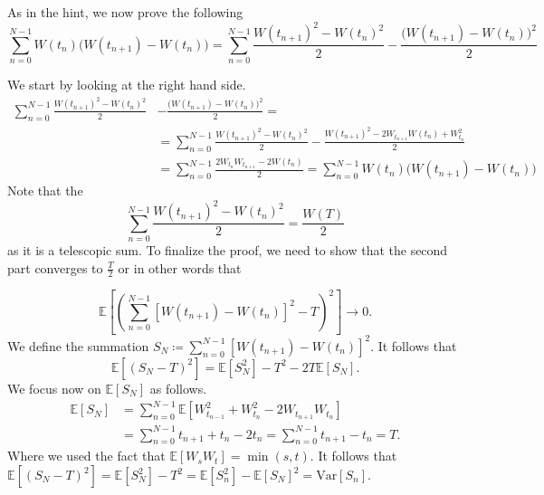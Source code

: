 \documentclass[a4paper,12pt]{article} %
\newcommand{\Var}{\mathrm{Var}}
\begin{document}
\subsection{}
As in the hint, we now prove the following
\begin{equation}
    \sum_{n=0}^{N-1} W(t_n) \big( W(t_{n+1}) - W(t_n) \big) = \sum_{n=0}^{N-1} \frac{W(t_{n+1})^2 - W(t_n)^2}{2} - \frac{\big( W(t_{n+1}) - W(t_n) \big)^2}{2}
\end{equation}

We start by looking at the right hand side.
\begin{align*}
    \sum_{n=0}^{N-1} \frac{W(t_{n+1})^2 - W(t_n)^2}{2}
     & - \frac{\big( W(t_{n+1}) - W(t_n) \big)^2}{2}  =                                                                         \\
     & =  \sum_{n=0}^{N-1} \frac{W(t_{n+1})^2 - W(t_n)^2}{2} - \frac{W(t_{n+1})^{2}  - 2W_{t_{n+1}} W(t_n)  + W_{t_n}^{2} }{2}  \\
     & = \sum_{n=0}^{N-1} \frac{2W_{t_n}W_{t_{n+1} } - 2 W(t_n)}{2}  =  \sum_{n=0}^{N-1} W(t_n) \big( W(t_{n+1}) - W(t_n) \big)
\end{align*}
Note that the
\begin{equation}
    \sum_{n=0}^{N-1} \frac{W(t_{n+1})^2 - W(t_n)^2}{2}  = \frac{W(T)}{2}
\end{equation}
as it is a telescopic sum. To finalize the proof, we need to show that the second part converges to \(\frac{T}{2}\) or in other words that

\begin{equation}
    \mathbb{E} \left[ \left( \sum_{n=0}^{N-1} \left[ W(t_{n+1}) - W(t_n) \right]^2 - T \right)^{2}   \right] \to 0.
\end{equation}
We define the summation \(S_N\coloneqq  \sum_{n=0}^{N-1} \left[ W(t_{n+1}) - W(t_n) \right]^2 \).
It follows that
\begin{equation}
    \mathbb{E} \left[ (S_N - T)^2 \right]  = \mathbb{E} \left[ S_N ^2 \right] - T^2 -2 T\mathbb{E} \left[ S_N  \right].
\end{equation}
We focus now on \(\mathbb{E} \left[ S_N \right]\) as follows.
\begin{align*}
    \mathbb{E} \left[ S_N \right] &
    = \sum_{n=0}^{N-1} \mathbb{E} \left[ W_{t_{n-1} }^{2}+W_{t_n}^2 - 2 W_{t_{n+1} }W_{t_n} \right]              \\
                                  & =\sum_{n=0} ^{N-1}  t_{n+1} +t_n -2t_n = \sum_{n=0} ^{N-1} t_{n+1} -t_n = T.
\end{align*}
Where we used the fact that \(\mathbb{E} \left[ W_s W_t \right] = \min(s,t)\).
It follows that \(\mathbb{E} \left[ (S_N-T)^2 \right]= \mathbb{E} \left[ S_N^2 \right] -T^2 = \mathbb{E} \left[ S_n^2 \right]-\mathbb{E} \left[ S_N \right]^2= \Var \left[S_n \right] \).
\end{document}
